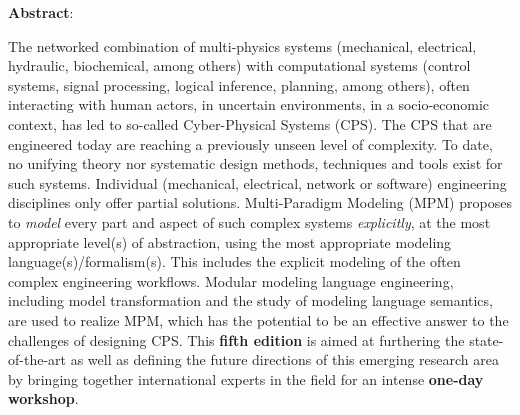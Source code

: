 \documentclass[runningheads]{llncs}
\begin{document}
\noindent
\textbf{Abstract}: 
\begin{small}
The networked combination of multi-physics systems (mechanical, 
electrical, hydraulic, biochemical, among others) with computational systems 
(control systems, signal processing, logical inference, planning, among others), 
often interacting with human actors, in uncertain environments, in a socio-economic 
context, has led to so-called Cyber-Physical Systems (CPS).
%
The CPS that are engineered today are reaching a previously unseen level of 
complexity.
To date, no unifying theory nor systematic design methods, techniques and tools 
exist for such systems.
Individual (mechanical, electrical, network or software) engineering disciplines 
only offer partial solutions.
Multi-Paradigm Modeling (MPM) proposes to \emph{model} every part and aspect of 
such complex systems \emph{explicitly}, at the most appropriate level(s) of 
abstraction, using the most appropriate modeling language(s)/formalism(s).
This includes the explicit modeling of the often complex engineering workflows.
Modular modeling language engineering, including model transformation and the 
study of modeling language semantics, are used to realize MPM, which has the 
potential to be an effective answer to the challenges of designing CPS.
%
This \textbf{fifth edition} is aimed at furthering the state-of-the-art as well as 
defining the future directions of this emerging research area by bringing together 
international experts in the field for an intense \textbf{one-day workshop}.
\end{small}







% 

\end{document}
